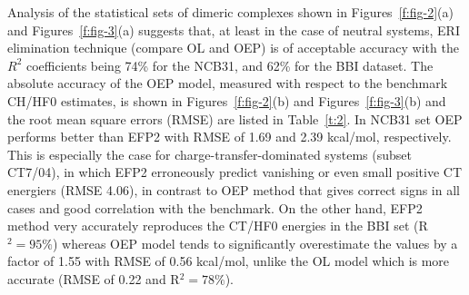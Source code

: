 Analysis of the statistical sets of dimeric complexes
shown in Figures~\ref{f:fig-2}(a) and Figures~\ref{f:fig-3}(a)
suggests that, at least in the case of neutral systems,
ERI elimination technique (compare OL and OEP)
is of acceptable accuracy with the $R^2$ coefficients
being 74\% for the NCB31, and 62\% for the BBI dataset. 
The absolute accuracy of the OEP model, measured with respect to the benchmark
CH/HF0 estimates, is shown in Figures~\ref{f:fig-2}(b) and Figures~\ref{f:fig-3}(b)
and the root mean square errors (RMSE)
are listed in Table~\ref{t:2}. In NCB31 set OEP performs better than EFP2
with
RMSE of 1.69 and 2.39 kcal/mol, respectively. This is especially
the case for charge\hyp{}transfer\hyp{}dominated systems (subset CT7/04),
in which EFP2 erroneously predict vanishing or even small
positive CT energiers (RMSE 4.06), in contrast to OEP method that gives correct
signs in all cases and good correlation with the benchmark.
On the other hand, EFP2 method very accurately reproduces the CT/HF0 energies
in the BBI set (R$^2=95\%$) whereas OEP model tends to significantly overestimate
the values by a factor of 1.55 with RMSE of 0.56 kcal/mol, 
unlike the OL model which is more accurate
(RMSE of 0.22 and R$^2=78\%$). 
%
